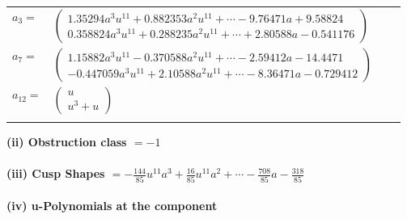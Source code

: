 \documentclass[1p]{elsarticle_modified}
\theoremstyle{definition}
\begin{document}
\begin{tabular}{m{7pt} m{180pt} m{7pt} m{180pt} }
\flushright $a_{3}=$&$\begin{pmatrix}1.35294 a^{3} u^{11}+0.882353 a^{2} u^{11}+\cdots-9.76471 a+9.58824\\0.358824 a^{3} u^{11}+0.288235 a^{2} u^{11}+\cdots+2.80588 a-0.541176\end{pmatrix}$ \\
\flushright $a_{7}=$&$\begin{pmatrix}1.15882 a^{3} u^{11}-0.370588 a^{2} u^{11}+\cdots-2.59412 a-14.4471\\-0.447059 a^{3} u^{11}+2.10588 a^{2} u^{11}+\cdots-8.36471 a-0.729412\end{pmatrix}$ \\
\flushright $a_{12}=$&$\begin{pmatrix}u\\u^3+u\end{pmatrix}$\\&\end{tabular}
\flushleft \textbf{(ii) Obstruction class $= -1$}\\~\\
\flushleft \textbf{(iii) Cusp Shapes $= -\frac{144}{85} u^{11} a^3+\frac{16}{85} u^{11} a^2+\cdots-\frac{708}{85} a-\frac{318}{85}$}\\~\\
\newpage\renewcommand{\arraystretch}{1}
\flushleft \textbf{(iv) u-Polynomials at the component}\newline \\
\end{document}
